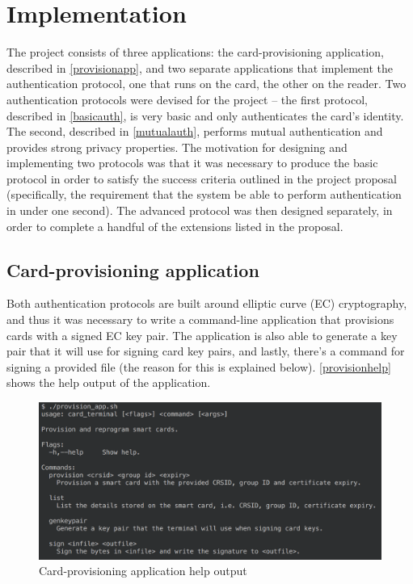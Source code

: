 \documentclass[12pt,a4paper,twoside,openright]{report}
\begin{document}
\chapter{Implementation}

The project consists of three applications: the card-provisioning application, described in \autoref{provisionapp}, and two separate applications that implement the authentication protocol, one that runs on the card, the other on the reader. Two authentication protocols were devised for the project -- the first protocol, described in \autoref{basicauth}, is very basic and only authenticates the card's identity. The second, described in \autoref{mutualauth}, performs mutual authentication and provides strong privacy properties. The motivation for designing and implementing two protocols was that it was necessary to produce the basic protocol in order to satisfy the success criteria outlined in the project proposal (specifically, the requirement that the system be able to perform authentication in under one second). The advanced protocol was then designed separately, in order to complete a handful of the extensions listed in the proposal.

\section{Card-provisioning application}
\label{provisionapp}

Both authentication protocols are built around elliptic curve (EC) cryptography, and thus it was necessary to write a command-line application that provisions cards with a signed EC key pair. The application is also able to generate a key pair that it will use for signing card key pairs, and lastly, there's a command for signing a provided file (the reason for this is explained below). \autoref{provisionhelp} shows the help output of the application.

\begin{figure}[tbh]
\centerline{\includegraphics[scale=0.7]{figures/provisionhelp.png}}
\caption{Card-provisioning application help output}
\label{provisionhelp}
\end{figure}
\end{document}
